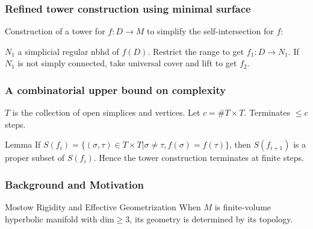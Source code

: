 \documentclass[t]{beamer}
\begin{document}
\begin{frame}
	\frametitle{Refined tower construction using minimal surface}
	Construction of a tower for $f:D \rightarrow M$ to simplify the self-intersection for $f$:
	\par 
	$N_1$ a simplicial regular nbhd of $f(D)$. Restrict the range to get $f_1: D \rightarrow N_1$. If $N_1$ is not simply connected, take universal cover and lift to get $f_2$. 
\end{frame}

\begin{frame}
	\frametitle{A combinatorial upper bound on complexity}
	$T$ is the collection of open simplices and vertices. Let $c = \# T \times T$. Terminates $\leq c $ steps. \par
	\begin{block}{Lemma}
		If $S(f_i)=\{ (\sigma, \tau) \in T \times T|\sigma \neq \tau,  f(\sigma)=f(\tau)\}$, then $S(f_{i+1})$ is a proper subset of $S(f_i)$. Hence the tower construction terminates at finite steps. 
	\end{block}
\end{frame}

\begin{frame}
	
\end{frame}

\begin{frame}[t]
	\frametitle{Background and Motivation}
	\begin{block}{Mostow Rigidity and Effective Geometrization}
		When $M$ is finite-volume hyperbolic manifold with dim$\geq 3$, its geometry is determined by its topology. \par
	\end{block}
\end{frame}
\end{document}

